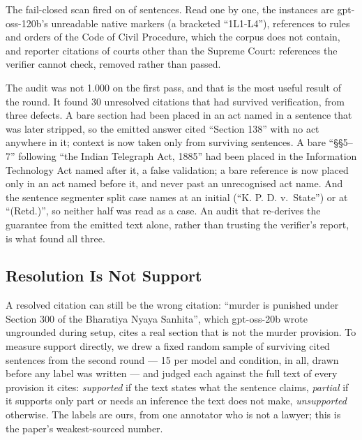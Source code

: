 \documentclass[conference]{IEEEtran}
\begin{document}
The fail-closed scan fired on \RtwoResidual{} of \RtwoSentences{} sentences. Read one by one, the instances are gpt-oss-120b's unreadable native markers (a bracketed ``1\textdagger{}L1-L4''), references to rules and orders of the Code of Civil Procedure, which the corpus does not contain, and reporter citations of courts other than the Supreme Court: references the verifier cannot check, removed rather than passed.

The audit was not 1.000 on the first pass, and that is the most useful result of the round. It found 30 unresolved citations that had survived verification, from three defects. A bare section had been placed in an act named in a sentence that was later stripped, so the emitted answer cited ``Section 138'' with no act anywhere in it; context is now taken only from surviving sentences. A bare ``\S\S 5--7'' following ``the Indian Telegraph Act, 1885'' had been placed in the Information Technology Act named after it, a false validation; a bare reference is now placed only in an act named before it, and never past an unrecognised act name. And the sentence segmenter split case names at an initial (``K. P. D. v.\ State'') or at ``(Retd.)'', so neither half was read as a case. An audit that re-derives the guarantee from the emitted text alone, rather than trusting the verifier's report, is what found all three.

\subsection{Resolution Is Not Support}
\label{ssec:support}

A resolved citation can still be the wrong citation: ``murder is punished under Section 300 of the Bharatiya Nyaya Sanhita'', which gpt-oss-20b wrote ungrounded during setup, cites a real section that is not the murder provision. To measure support directly, we drew a fixed random sample of surviving cited sentences from the second round --- 15 per model and condition, \SupN{} in all, drawn before any label was written --- and judged each against the full text of every provision it cites: \emph{supported} if the text states what the sentence claims, \emph{partial} if it supports only part or needs an inference the text does not make, \emph{unsupported} otherwise. The labels are ours, from one annotator who is not a lawyer; this is the paper's weakest-sourced number.

\SupTable
\end{document}
